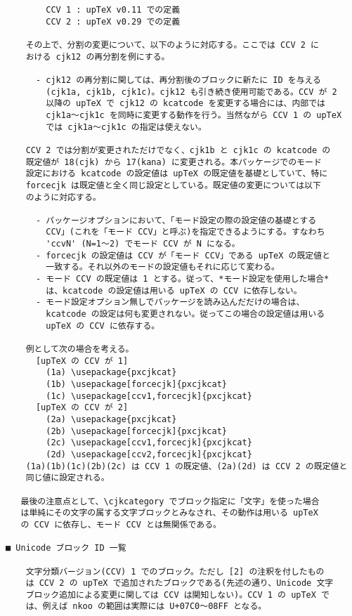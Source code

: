 \documentclass[uplatex,dvipdfmx,a4paper]{jsarticle}
\begin{document}
\begin{verbatim}
        CCV 1 : upTeX v0.11 での定義
        CCV 2 : upTeX v0.29 での定義

    その上で、分割の変更について、以下のように対応する。ここでは CCV 2 に
    おける cjk12 の再分割を例にする。

      - cjk12 の再分割に関しては、再分割後のブロックに新たに ID を与える
        (cjk1a, cjk1b, cjk1c)。cjk12 も引き続き使用可能である。CCV が 2
        以降の upTeX で cjk12 の kcatcode を変更する場合には、内部では
        cjk1a～cjk1c を同時に変更する動作を行う。当然ながら CCV 1 の upTeX
        では cjk1a～cjk1c の指定は使えない。

    CCV 2 では分割が変更されただけでなく、cjk1b と cjk1c の kcatcode の
    既定値が 18(cjk) から 17(kana) に変更される。本パッケージでのモード
    設定における kcatcode の設定値は upTeX の既定値を基礎としていて、特に
    forcecjk は既定値と全く同じ設定としている。既定値の変更については以下
    のように対応する。

      - パッケージオプションにおいて、「モード設定の際の設定値の基礎とする
        CCV」(これを「モード CCV」と呼ぶ)を指定できるようにする。すなわち
        'ccvN' (N=1～2) でモード CCV が N になる。
      - forcecjk の設定値は CCV が「モード CCV」である upTeX の既定値と
        一致する。それ以外のモードの設定値もそれに応じて変わる。
      - モード CCV の既定値は 1 とする。従って、*モード設定を使用した場合*
        は、kcatcode の設定値は用いる upTeX の CCV に依存しない。
      - モード設定オプション無しでパッケージを読み込んだだけの場合は、
        kcatcode の設定は何も変更されない。従ってこの場合の設定値は用いる
        upTeX の CCV に依存する。

    例として次の場合を考える。
      [upTeX の CCV が 1]
        (1a) \usepackage{pxcjkcat}
        (1b) \usepackage[forcecjk]{pxcjkcat}
        (1c) \usepackage[ccv1,forcecjk]{pxcjkcat}
      [upTeX の CCV が 2]
        (2a) \usepackage{pxcjkcat}
        (2b) \usepackage[forcecjk]{pxcjkcat}
        (2c) \usepackage[ccv1,forcecjk]{pxcjkcat}
        (2d) \usepackage[ccv2,forcecjk]{pxcjkcat}
    (1a)(1b)(1c)(2b)(2c) は CCV 1 の既定値、(2a)(2d) は CCV 2 の既定値と
    同じ値に設定される。

   最後の注意点として、\cjkcategory でブロック指定に「文字」を使った場合
   は単純にその文字の属する文字ブロックとみなされ、その動作は用いる upTeX
   の CCV に依存し、モード CCV とは無関係である。

■ Unicode ブロック ID 一覧

    文字分類バージョン(CCV) 1 でのブロック。ただし [2] の注釈を付したもの
    は CCV 2 の upTeX で追加されたブロックである(先述の通り、Unicode 文字
    ブロック追加による変更に関しては CCV は関知しない)。CCV 1 の upTeX で
    は、例えば nkoo の範囲は実際には U+07C0～08FF となる。


\end{verbatim}
\end{document}
